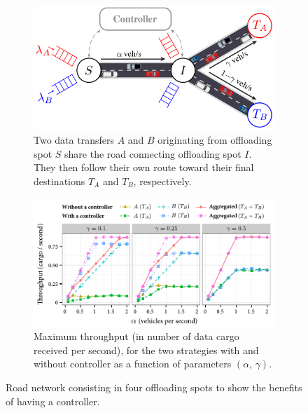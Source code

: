 \begin{figure}[ht]
    \centering
    \begin{subfigure}[t]{0.45\columnwidth}
        \centering
        \includegraphics[width=\textwidth]{figures/simpleScenario.pdf}
        \caption{Two data transfers $A$ and $B$ originating from offloading spot $S$ share the road connecting offloading spot $I$. They then follow their own route toward their final destinations $T_A$ and $T_B$, respectively.}
        \label{fig:simple-scenario}
    \end{subfigure}%
    \quad %
    \begin{subfigure}[t]{0.51\columnwidth}
        \centering
        \includegraphics[width=\textwidth]{results/simpleScenario-throughput_v2_gamma_all.pdf}
        \caption{Maximum throughput (in number of data cargo received per second), for the two strategies with and without controller as a function of parameters $(\alpha,\,\gamma)$.}
        \label{fig:simple-scenario-throughput}
    \end{subfigure}
    \caption{Road network consisting in four offloading spots to show the benefits of having a controller.}
\end{figure}

